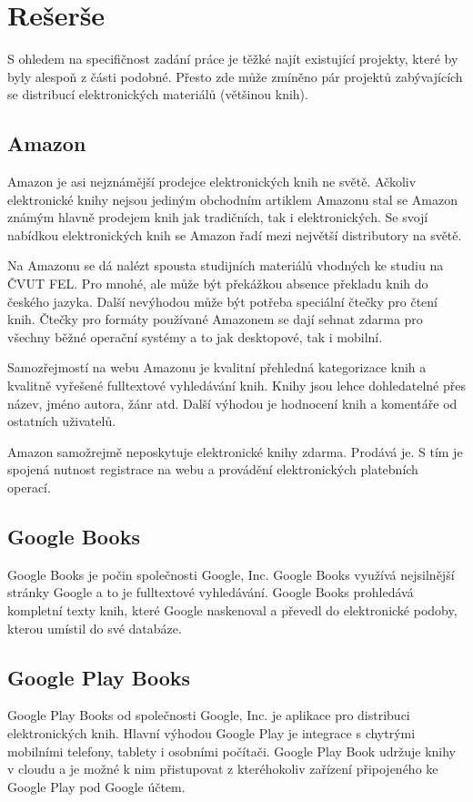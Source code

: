 \section{Rešerše}
S ohledem na specifičnost zadání práce je těžké najít existující projekty, které by byly alespoň z části podobné. Přesto zde může zmíněno pár projektů zabývajících se distribucí elektronických materiálů (většinou knih).  

\subsection{Amazon}
Amazon\cite{AMAZON} je asi nejznámější prodejce elektronických knih ne světě. Ačkoliv elektronické knihy nejsou jediným obchodním artiklem Amazonu stal se Amazon známým hlavně prodejem knih jak tradičních, tak i elektronických. Se svojí nabídkou elektronických knih se Amazon řadí mezi největší distributory na světě. 

Na Amazonu se dá nalézt spousta studijních materiálů vhodných ke studiu na ČVUT FEL. Pro mnohé, ale může být překážkou absence překladu knih do českého jazyka. Další nevýhodou může být potřeba speciální čtečky pro čtení knih. Čtečky pro formáty používané Amazonem se dají sehnat zdarma pro všechny běžné operační systémy a to jak desktopové, tak i mobilní.

Samozřejmostí na webu Amazonu je kvalitní přehledná kategorizace knih a kvalitně vyřešené fulltextové vyhledávání knih. Knihy jsou lehce dohledatelné přes název, jméno autora, žánr atd. Další výhodou je hodnocení knih a komentáře od ostatních uživatelů.  

Amazon samožrejmě neposkytuje elektronické knihy zdarma. Prodává je. S tím je spojená nutnost registrace na webu a provádění elektronických platebních operací. 

\subsection{Google Books}
Google Books\cite{GOOGLEBOOKS} je počin společnosti Google, Inc. Google Books využívá nejsilnější stránky Google a to je fulltextové vyhledávání. Google Books prohledává kompletní texty knih, které Google naskenoval a převedl do elektronické podoby, kterou umístil do své databáze.

\subsection{Google Play Books}
Google Play\cite{GOOGLEPLAY} Books od společnosti Google, Inc. je aplikace pro distribuci elektronických knih. Hlavní výhodou Google Play je integrace s chytrými mobilními telefony, tablety i osobními počítači. Google Play Book udržuje knihy v cloudu a je možné k nim přistupovat z kteréhokoliv zařízení připojeného ke Google Play pod Google účtem.  

